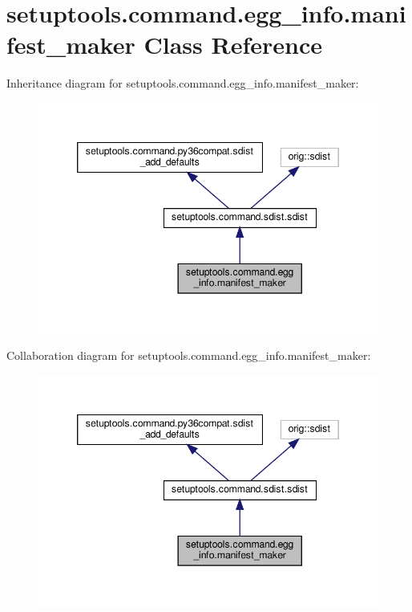 \hypertarget{classsetuptools_1_1command_1_1egg__info_1_1manifest__maker}{}\section{setuptools.\+command.\+egg\+\_\+info.\+manifest\+\_\+maker Class Reference}
\label{classsetuptools_1_1command_1_1egg__info_1_1manifest__maker}


Inheritance diagram for setuptools.\+command.\+egg\+\_\+info.\+manifest\+\_\+maker\+:
\nopagebreak
\begin{figure}[H]
\begin{center}
\leavevmode
\includegraphics[width=346pt]{classsetuptools_1_1command_1_1egg__info_1_1manifest__maker__inherit__graph}
\end{center}
\end{figure}


Collaboration diagram for setuptools.\+command.\+egg\+\_\+info.\+manifest\+\_\+maker\+:
\nopagebreak
\begin{figure}[H]
\begin{center}
\leavevmode
\includegraphics[width=346pt]{classsetuptools_1_1command_1_1egg__info_1_1manifest__maker__coll__graph}
\end{center}
\end{figure}
